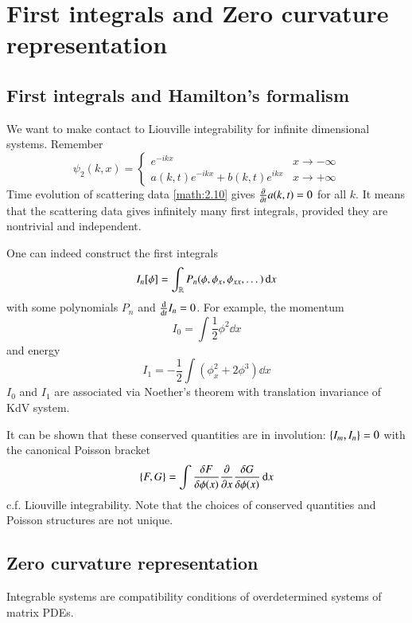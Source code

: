 \chapter{First integrals and Zero curvature representation}
\section{First integrals and Hamilton's formalism}
We want to make contact to Liouville integrability for infinite dimensional systems. Remember 
\begin{equation*}
	\psi_2 (k, x) = 
	\begin{cases}
		e^{-ikx} & x \rightarrow - \infty \\
		a(k, t) e^{-ikx} + b(k, t) e^{ikx} & x \rightarrow + \infty
	\end{cases}
\end{equation*}
Time evolution of scattering data \eqref{math:2.10} gives $\pdv{t} a(k, t)  = 0$ for all $k$. It means that the scattering data gives infinitely many first integrals, provided they are nontrivial and independent.

One can indeed construct the first integrals
\begin{equation*}
	I_n [\phi] = \int_{\mathbb{R}} P_n(\phi, \phi_x, \phi_{x x}, \dots) \dd{x}
\end{equation*}
with some polynomials $P_n$ and $\dv{t} I_n = 0$. For example, the momentum
\begin{equation*}
	I_0 = \int \frac{1}{2} \phi^2 \dd{x}
\end{equation*}
and energy
\begin{equation*}
	I_1 = -\frac{1}{2} \int (\phi_x^2 + 2 \phi^3) \dd{x}
\end{equation*}
$I_0$ and $I_1$ are associated via Noether's theorem with translation invariance of KdV system.

It can be shown that these conserved quantities are in involution: $\pb{I_m}{I_n} = 0$ with the canonical Poisson bracket
\begin{equation*}
	\pb{F}{G} = \int \fdv{F}{\phi(x)} \pdv{x} \fdv{G}{\phi(x)} \dd{x}
\end{equation*}
c.f. Liouville integrability. Note that the choices of conserved quantities and Poisson structures are not unique.

\section{Zero curvature representation}
Integrable systems are compatibility conditions of overdetermined systems of matrix PDEs.

